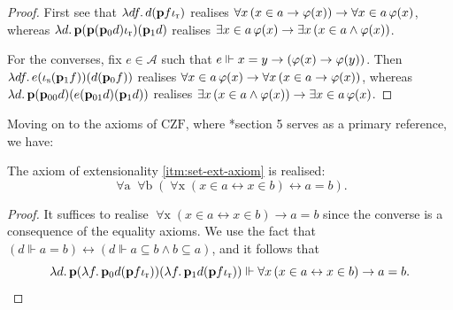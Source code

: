 \documentclass[12pt,openany]{book}
\theoremstyle{plain}
\theoremstyle{definition}
\newcommand\opA[1]{\mathop{\forall #1}}
\newcommand\opE[1]{\mathop{\exists #1}}
\newcommand\oplam[1]{\mathop{\lambda #1.}}
\newcommand\CZF{\mathrm{CZF}}
\newcommand\bp{\mathbf{p}}
\newcommand\ior{\iota_\textup{r}}
\newcommand\ios{\iota_\textup{s}}
\begin{document}
\begin{proof}
  First see that $\oplam{df} d \mleft(\bp f \ior\mright)$ realises $\opA{x} \left(x \in a \rightarrow \varphi\mleft(x\mright)\right) \rightarrow \opA{x \in a} \varphi\mleft(x\mright)$, whereas $\oplam{d} \bp \mleft(\bp \mleft(\bp_0 d\mright) \ior\mright) \mleft(\bp_1 d\mright)$ realises $\opE{x \in a} \varphi\mleft(x\mright) \rightarrow \opE{x} \left(x \in a \land \varphi\mleft(x\mright)\right)$.

  For the converses, fix $e \in \mathcal{A}$ such that $e \Vdash x = y \rightarrow \left(\varphi\mleft(x\mright) \rightarrow \varphi\mleft(y\mright)\right)$. Then $\oplam{df} e \mleft(\ios \mleft(\bp_1 f\mright)\mright) \mleft(d \mleft(\bp_0 f\mright)\mright)$ realises $\opA{x \in a} \varphi\mleft(x\mright) \rightarrow \opA{x} \left(x \in a \rightarrow \varphi\mleft(x\mright)\right)$, whereas $\oplam{d} \bp \mleft(\bp_{00}d\mright) \mleft(e \mleft(\bp_{01} d\mright) \mleft(\bp_1 d\mright)\mright)$ realises $\opE{x} \left(x \in a \land \varphi\mleft(x\mright)\right) \rightarrow \opE{x \in a} \varphi\mleft(x\mright)$.
\end{proof}

Moving on to the axioms of $\CZF$, where \cite{rathjen06-czf-realizability}*{section 5} serves as a primary reference, we have:
\begin{lemma}
  The axiom of extensionality \ref{itm:set-ext-axiom} is realised:
  \[\opA{a} \opA{b} \left(\opA{x} \left(x \in a \leftrightarrow x \in b\right) \leftrightarrow a = b\right).\]
\end{lemma}

\begin{proof}
  It suffices to realise $\opA{x} \left(x \in a \leftrightarrow x \in b\right) \rightarrow a = b$ since the converse is a consequence of the equality axioms. We use the fact that $\left(d \Vdash a = b\right) \leftrightarrow \left(d \Vdash a \subseteq b \land b \subseteq a\right)$, and it follows that
  \[\oplam{d} \bp \mleft(\oplam{f} \bp_0 d \mleft(\bp f \ior\mright)\mright) \mleft(\oplam{f} \bp_1 d \mleft(\bp f \ior\mright)\mright) \Vdash \opA{x} \left(x \in a \leftrightarrow x \in b\right) \rightarrow a = b. \qedhere\]
\end{proof}
\end{document}
